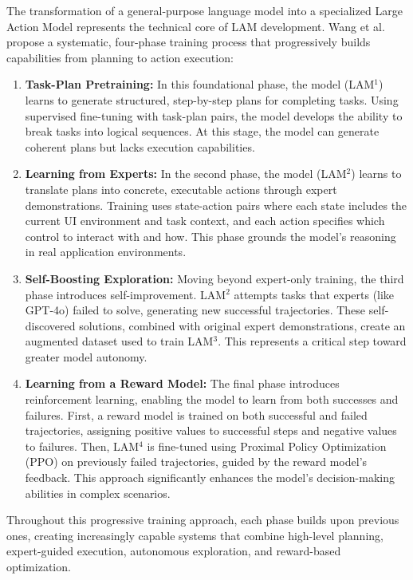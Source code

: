 \documentclass[journal,twoside,10pt]{IEEEtran}
\begin{document}
The transformation of a general-purpose language model into a specialized Large Action Model represents the technical core of LAM development. Wang et al. \cite{wang2025lam} propose a systematic, four-phase training process that progressively builds capabilities from planning to action execution:

\begin{enumerate}
    \item \textbf{Task-Plan Pretraining:} In this foundational phase, the model (LAM$^1$) learns to generate structured, step-by-step plans for completing tasks. Using supervised fine-tuning with task-plan pairs, the model develops the ability to break tasks into logical sequences. At this stage, the model can generate coherent plans but lacks execution capabilities.
    
    \item \textbf{Learning from Experts:} In the second phase, the model (LAM$^2$) learns to translate plans into concrete, executable actions through expert demonstrations. Training uses state-action pairs where each state includes the current UI environment and task context, and each action specifies which control to interact with and how. This phase grounds the model's reasoning in real application environments.
    
    \item \textbf{Self-Boosting Exploration:} Moving beyond expert-only training, the third phase introduces self-improvement. LAM$^2$ attempts tasks that experts (like GPT-4o) failed to solve, generating new successful trajectories. These self-discovered solutions, combined with original expert demonstrations, create an augmented dataset used to train LAM$^3$. This represents a critical step toward greater model autonomy.
    
    \item \textbf{Learning from a Reward Model:} The final phase introduces reinforcement learning, enabling the model to learn from both successes and failures. First, a reward model is trained on both successful and failed trajectories, assigning positive values to successful steps and negative values to failures. Then, LAM$^4$ is fine-tuned using Proximal Policy Optimization (PPO) on previously failed trajectories, guided by the reward model's feedback. This approach significantly enhances the model's decision-making abilities in complex scenarios.
\end{enumerate}

Throughout this progressive training approach, each phase builds upon previous ones, creating increasingly capable systems that combine high-level planning, expert-guided execution, autonomous exploration, and reward-based optimization.
\end{document}
